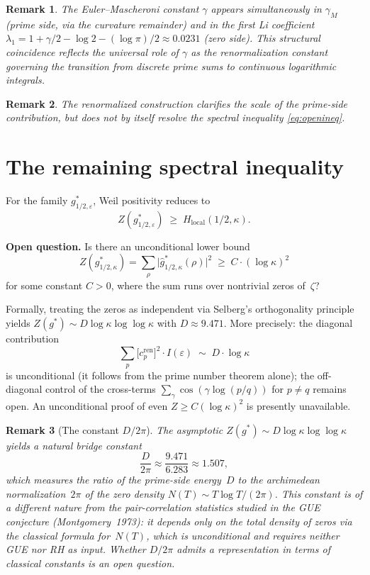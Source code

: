 \documentclass[11pt]{article}
\newtheorem*{remark*}{Remark}
\begin{document}
\begin{remark*}
The Euler--Mascheroni constant $\gamma$ appears simultaneously
in $\gamma_M$ (prime side, via the curvature remainder) and in the
first Li coefficient
$\lambda_1 = 1 + \gamma/2 - \log 2 - (\log\pi)/2 \approx 0.0231$
(zero side). This structural coincidence reflects the universal role
of $\gamma$ as the renormalization constant governing the transition
from discrete prime sums to continuous logarithmic integrals.
\end{remark*}

\begin{remark*}
The renormalized construction clarifies the scale of the prime-side
contribution, but does not by itself resolve the spectral inequality
\eqref{eq:openineq}.
\end{remark*}

\section{The remaining spectral inequality}\label{sec:open}

For the family $g^*_{1/2,\varepsilon}$, Weil positivity reduces to
\begin{equation}\label{eq:openineq}
Z(g^*_{1/2,\varepsilon})
\;\ge\;
H_{\mathrm{local}}(1/2,\kappa).
\end{equation}

\textbf{Open question.}
Is there an unconditional lower bound
\[
Z(g^*_{1/2,\kappa})
= \sum_{\rho}\bigl|\widehat g^*_{1/2,\kappa}(\rho)\bigr|^2
\;\ge\;
C\cdot(\log\kappa)^2
\]
for some constant $C>0$, where the sum runs over nontrivial zeros of~$\zeta$?

Formally, treating the zeros as independent via Selberg's
orthogonality principle~\cite{selberg} yields
$Z(g^*)\sim D\log\kappa\log\log\kappa$ with $D\approx 9.471$.
More precisely: the diagonal contribution
\[
\sum_p \bigl[c_p^{\mathrm{ren}}\bigr]^2 \cdot I(\varepsilon)
\;\sim\; D \cdot \log\kappa
\]
is unconditional (it follows from the prime number theorem alone);
the off-diagonal control of the cross-terms
$\sum_\gamma \cos(\gamma\log(p/q))$ for $p\neq q$
remains open. An unconditional proof of even
$Z\ge C(\log\kappa)^2$ is presently unavailable.

\begin{remark*}[The constant $D/2\pi$]
The asymptotic $Z(g^*)\sim D\log\kappa\log\log\kappa$ yields a
natural bridge constant
\[
\frac{D}{2\pi} \approx \frac{9.471}{6.283} \approx 1.507,
\]
which measures the ratio of the prime-side energy~$D$
to the archimedean normalization~$2\pi$ of the zero density
$N(T)\sim T\log T/(2\pi)$.
This constant is of a different nature from the pair-correlation
statistics studied in the GUE conjecture
(Montgomery~1973): it depends only on the total density of zeros
via the classical formula for~$N(T)$, which is unconditional
and requires neither GUE nor RH as input.
Whether $D/2\pi$ admits a representation in terms of
classical constants is an open question.
\end{remark*}
\end{document}
